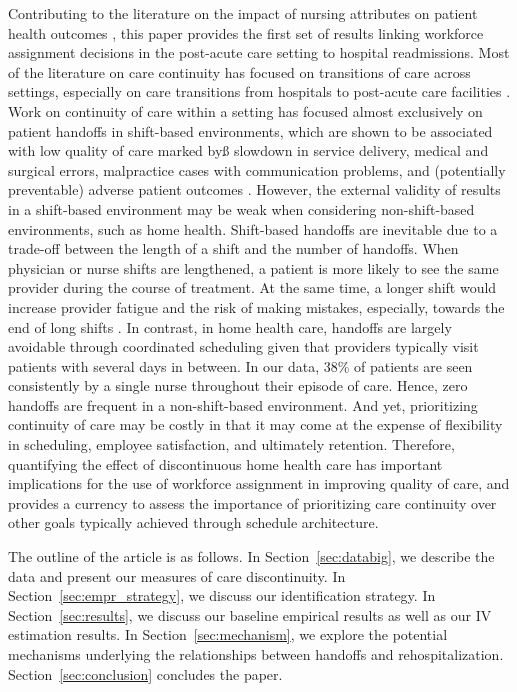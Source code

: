 \documentclass[final,12pt, notitlepage]{article}
\begin{document}
Contributing to the literature on the impact of nursing attributes on patient health outcomes \citep{Aiken2002, Bae2010, Needleman2011, Cook2012, Lin2014, Lu2016, Hockenberry2016}, this paper provides the first set of results linking workforce assignment decisions in the post-acute care setting to hospital readmissions.
Most of the literature on care continuity has focused on transitions of care across settings, especially on care transitions from hospitals to post-acute care facilities \citep{Naylor1999}.
Work on continuity of care within a setting has focused almost exclusively on patient handoffs in shift-based environments, which are shown to be associated with low quality of care marked byß slowdown in service delivery, medical and surgical errors, malpractice cases with communication problems, and (potentially preventable) adverse patient outcomes \citep{Laine1993, Petersen1994, Riesenberg2009}.
However, the external validity of results in a shift-based environment may be weak when considering non-shift-based environments, such as home health.  Shift-based handoffs are inevitable due to a trade-off between the length of a shift and the number of handoffs. When physician or nurse shifts are lengthened, a patient is more likely to see the same provider during the course of treatment. At the same time, a longer shift would increase provider fatigue and the risk of making mistakes, especially, towards the end of long shifts \citep{Brachet2012}. In contrast, in home health care, handoffs are largely avoidable through coordinated scheduling given that providers typically visit patients with several days in between. In our data, 38\% of patients are seen consistently by a single nurse throughout their episode of care. Hence, zero handoffs are frequent in a non-shift-based environment.  And yet, prioritizing continuity of care may be costly in that it may come at the expense of flexibility in scheduling, employee satisfaction, and ultimately retention.
Therefore, quantifying the effect of discontinuous home health care has important implications for the use of workforce assignment in improving quality of care, and provides a currency to assess the importance of prioritizing care continuity over other goals typically achieved through schedule architecture.




The outline of the article is as follows. In Section~\ref{sec:databig}, we describe the data and present our measures of care discontinuity. In Section~\ref{sec:empr_strategy}, we discuss our identification strategy. In Section~\ref{sec:results}, we discuss our baseline empirical results as well as our IV estimation results. In Section~\ref{sec:mechanism}, we explore the potential mechanisms underlying the relationships between handoffs and rehospitalization. Section~\ref{sec:conclusion} concludes the paper.
\end{document}
